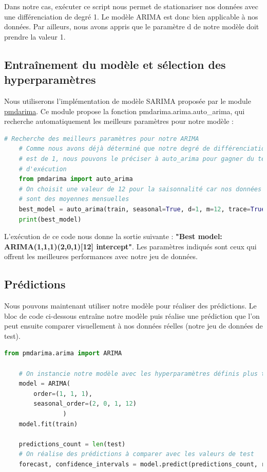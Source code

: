 \documentclass[french]{article}
\begin{document}
    Dans notre cas, exécuter ce script nous permet de stationariser nos données avec une différenciation de degré 1. Le modèle ARIMA est donc bien applicable à nos données. Par ailleurs, nous avons appris que le paramètre d de notre modèle doit prendre la valeur 1.

    \subsection{Entraînement du modèle et sélection des hyperparamètres}

    Nous utiliserons l'implémentation de modèle SARIMA proposée par le module \href{https://pypi.org/project/pmdarima/}{pmdarima}. Ce module propose la fonction pmdarima.arima.auto\_arima, qui recherche automatiquement les meilleurs paramètres pour notre modèle :
    \begin{lstlisting}[language=Python]
    # Recherche des meilleurs paramètres pour notre ARIMA
    # Comme nous avons déjà déterminé que notre degré de différenciation
    # est de 1, nous pouvons le préciser à auto_arima pour gagner du temps
    # d'exécution
    from pmdarima import auto_arima
    # On choisit une valeur de 12 pour la saisonnalité car nos données
    # sont des moyennes mensuelles
    best_model = auto_arima(train, seasonal=True, d=1, m=12, trace=True)
    print(best_model)
    \end{lstlisting}

    L'exécution de ce code nous donne la sortie suivante : \textbf{"Best model:  ARIMA(1,1,1)(2,0,1)[12] intercept"}. Les paramètres indiqués sont ceux qui offrent les meilleures performances avec notre jeu de données.

    \subsection{Prédictions}

    Nous pouvons maintenant utiliser notre modèle pour réaliser des prédictions. Le bloc de code ci-dessous entraîne notre modèle puis réalise une prédiction que l'on peut ensuite comparer visuellement à nos données réelles (notre jeu de données de test).
    \begin{lstlisting}[language=Python]
    from pmdarima.arima import ARIMA

    # On instancie notre modèle avec les hyperparamètres définis plus tôt
    model = ARIMA(
        order=(1, 1, 1),
        seasonal_order=(2, 0, 1, 12)
                )
    model.fit(train)

    predictions_count = len(test)
    # On réalise des prédictions à comparer avec les valeurs de test
    forecast, confidence_intervals = model.predict(predictions_count, return_conf_int=True) 
    \end{lstlisting}
\end{document}

